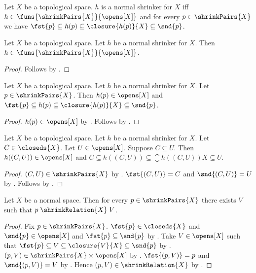 \begin{definition}\label{normal_shrinker}
    Let $X$ be a topological space.
    $h$ is a normal shrinker for $X$ iff
        $h\in\funs{\shrinkPairs{X}}{\opens[X]}$ and
        for every $p\in\shrinkPairs{X}$ we have
        $\fst{p}\subseteq h(p)\subseteq\closure{h(p)}{X}
            \subseteq\snd{p}$.
\end{definition}

\begin{proposition}\label{normal_shrinker_type}
    Let $X$ be a topological space.
    Let $h$ be a normal shrinker for $X$.
    Then $h\in\funs{\shrinkPairs{X}}{\opens[X]}$.
\end{proposition}
\begin{proof}
    Follows by .
\end{proof}

\begin{proposition}\label{normal_shrinker_apply}
    Let $X$ be a topological space.
    Let $h$ be a normal shrinker for $X$.
    Let $p\in\shrinkPairs{X}$.
    Then $h(p)\in\opens[X]$ and
        $\fst{p}\subseteq h(p)\subseteq\closure{h(p)}{X}
            \subseteq\snd{p}$.
\end{proposition}
\begin{proof}
    $h(p)\in\opens[X]$ by
        .
    Follows by .
\end{proof}

\begin{proposition}\label{normal_shrinker_apply_pair}
    Let $X$ be a topological space.
    Let $h$ be a normal shrinker for $X$.
    Let $C\in\closeds{X}$.
    Let $U\in\opens[X]$.
    Suppose $C\subseteq U$.
    Then $h((C,U))\in\opens[X]$ and
        $C\subseteq h((C,U))\subseteq\closure{h((C,U))}{X}
            \subseteq U$.
\end{proposition}
\begin{proof}
    $(C,U)\in\shrinkPairs{X}$ by .
    $\fst{(C,U)}=C$ and $\snd{(C,U)}=U$ by .
    Follows by .
\end{proof}

\begin{proposition}\label{normal_shrink_relation_is_total}
    Let $X$ be a normal space.
    Then for every $p\in\shrinkPairs{X}$ there exists $V$ such that
        $p\mathrel{\shrinkRelation{X}}V$.
\end{proposition}
\begin{proof}
    Fix $p\in\shrinkPairs{X}$.
    $\fst{p}\in\closeds{X}$ and $\snd{p}\in\opens[X]$ and
        $\fst{p}\subseteq\snd{p}$ by .
    Take $V\in\opens[X]$ such that
        $\fst{p}\subseteq V\subseteq\closure{V}{X}\subseteq\snd{p}$
        by .
    $(p,V)\in\shrinkPairs{X}\times\opens[X]$
        by .
    $\fst{(p,V)}=p$ and $\snd{(p,V)}=V$ by .
    Hence $(p,V)\in\shrinkRelation{X}$ by .
\end{proof}

